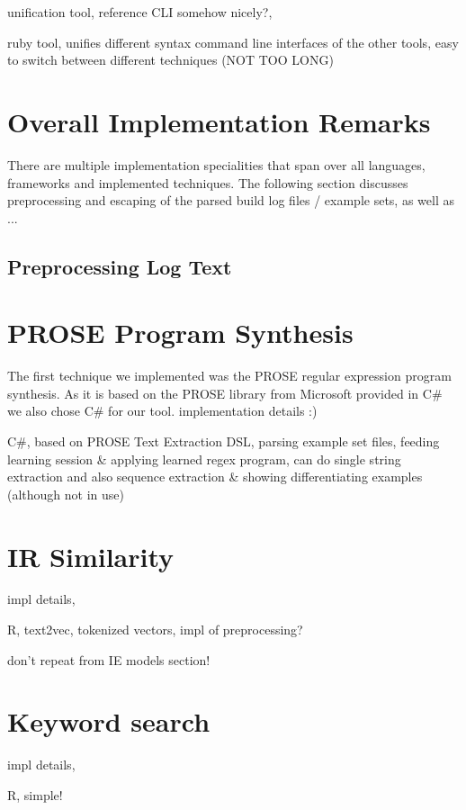 \documentclass[\myrootdir/main.tex]{subfiles}
\begin{document}
unification tool, reference CLI somehow nicely?,

ruby tool, unifies different syntax command line interfaces of the other tools, easy to switch between different techniques (NOT TOO LONG)

\section{Overall Implementation Remarks}
There are multiple implementation specialities that span over all languages, frameworks and implemented techniques.
The following section discusses preprocessing and escaping of the parsed build log files / example sets, as well as ... 

\subsection*{Preprocessing Log Text}
\label{sec:impl-preprocessing}

\section{PROSE Program Synthesis}
\label{sec:impl-pbe}
The first technique we implemented was the PROSE regular expression program synthesis. As it is based on the PROSE library from Microsoft provided in C\# we also chose C\# for our tool. 
implementation details :)

C\#, based on PROSE Text Extraction DSL, parsing example set files, feeding learning session \& applying learned regex program, can do single string extraction and also sequence extraction \& showing differentiating examples (although not in use)

\section{IR Similarity}
impl details,

R, text2vec, tokenized vectors, impl of preprocessing?

don't repeat from IE models section!

\section{Keyword search}
impl details,

R, simple!
\end{document}
